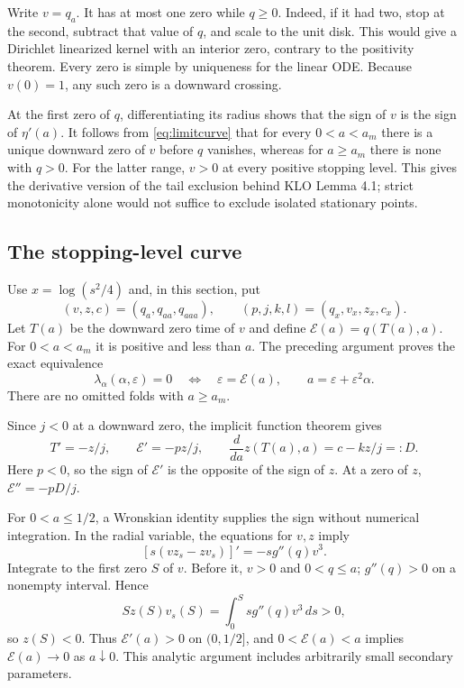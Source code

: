 \documentclass[11pt,a4paper]{report}
\begin{document}
Write $v=q_a$. It has at most one zero while $q\geq0$. Indeed, if it had
two, stop at the second, subtract that value of $q$, and scale to the unit
disk. This would give a Dirichlet linearized kernel with an interior zero,
contrary to the positivity theorem. Every zero is simple by uniqueness for
the linear ODE. Because $v(0)=1$, any such zero is a downward crossing.

At the first zero of $q$, differentiating its radius shows that the sign of
$v$ is the sign of $\eta'(a)$. It follows from \eqref{eq:limitcurve} that
for every $0<a<a_m$ there is a unique downward zero of $v$ before $q$ vanishes,
whereas for $a\geq a_m$ there is none with $q>0$.
For the latter range, $v>0$ at every positive stopping level. This gives the
derivative version of the tail exclusion behind KLO Lemma 4.1; strict
monotonicity alone would not suffice to exclude isolated stationary points.

\subsection{The stopping-level curve}
Use $x=\log(s^2/4)$ and, in this section, put
\[
 (v,z,c)=(q_a,q_{aa},q_{aaa}),\qquad
 (p,j,k,l)=(q_x,v_x,z_x,c_x).
\]
Let $T(a)$ be the downward zero time of $v$ and define
$\mathcal E(a)=q(T(a),a)$. For $0<a<a_m$ it is positive and less than $a$.
The preceding argument proves the exact equivalence
\begin{equation}\label{eq:foldlevel}
 \lambda_\alpha(\alpha,\varepsilon)=0
 \quad\Longleftrightarrow\quad
 \varepsilon=\mathcal E(a),\qquad a=\varepsilon+\varepsilon^2\alpha.
\end{equation}
There are no omitted folds with $a\geq a_m$.

Since $j<0$ at a downward zero, the implicit function theorem gives
\begin{equation}\label{eq:Ederiv}
 T'=-z/j,\qquad \mathcal E'=-pz/j,\qquad
 \frac{d}{da}z(T(a),a)=c-kz/j=:D.
\end{equation}
Here $p<0$, so the sign of $\mathcal E'$ is the opposite of the sign of $z$.
At a zero of $z$, $\mathcal E''=-pD/j$.

For $0<a\leq1/2$, a Wronskian identity supplies the sign without numerical
integration. In the radial variable, the equations for $v,z$ imply
\[
 [s(vz_s-zv_s)]'=-s g''(q)v^3.
\]
Integrate to the first zero $S$ of $v$. Before it, $v>0$ and $0<q\leq a$;
$g''(q)>0$ on a nonempty interval. Hence
\[
 S z(S)v_s(S)=\int_0^S s g''(q)v^3\,ds>0,
\]
so $z(S)<0$. Thus $\mathcal E'(a)>0$ on $(0,1/2]$, and
$0<\mathcal E(a)<a$ implies $\mathcal E(a)\to0$ as $a\downarrow0$.
This analytic argument includes arbitrarily small secondary parameters.
\end{document}

